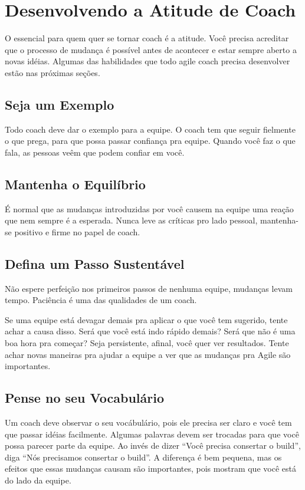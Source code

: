\documentclass[a4paper, 10pt, font=plain]{abnt}
\begin{document}
\section{Desenvolvendo a Atitude de Coach}
O essencial para quem quer se tornar coach é a atitude. Você precisa acreditar que o processo de mudança é possível antes de acontecer e estar sempre aberto a novas idéias.
Algumas das habilidades que todo agile coach precisa desenvolver estão nas próximas seções.

\subsection{Seja um Exemplo}
Todo coach deve dar o exemplo para a equipe. O coach tem que seguir fielmente o que prega, para que possa passar confiança pra equipe. Quando você faz o que fala, as pessoas veêm que podem confiar em você.

\subsection{Mantenha o Equilíbrio}
É normal que as mudanças introduzidas por você causem na equipe uma reação que nem sempre é a esperada. Nunca leve as críticas pro lado pessoal, mantenha-se positivo e firme no papel de coach.

\subsection{Defina um Passo Sustentável}
Não espere perfeição nos primeiros passos de nenhuma equipe, mudanças levam tempo. Paciência é uma das qualidades de um coach.

Se uma equipe está devagar demais pra aplicar o que você tem sugerido, tente achar a causa disso. Será que você está indo rápido demais? Será que não é uma boa hora pra começar?
Seja persistente, afinal, você quer ver resultados. Tente achar novas maneiras pra ajudar a equipe a ver que as mudanças pra Agile são importantes.

\subsection{Pense no seu Vocabulário}
Um coach deve observar o seu vocábulário, pois ele precisa ser claro e você tem que passar idéias facilmente.
Algumas palavras devem ser trocadas para que você possa parecer parte da equipe. Ao invés de dizer ``Você precisa consertar o build'', diga ``Nós precisamos consertar o build''. A diferença é bem pequena, mas os efeitos que essas mudanças causam são importantes, pois mostram que você está do lado da equipe.
\end{document}
